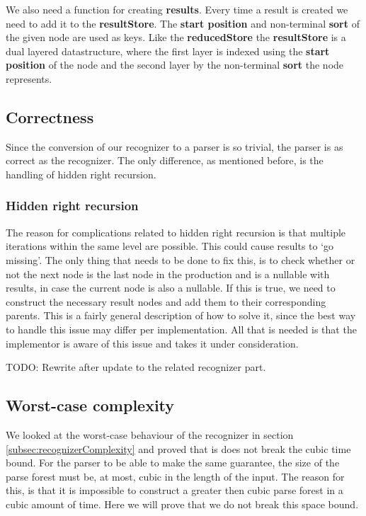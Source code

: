 \documentclass[a4paper,10pt]{article}
\begin{document}
We also need a function for creating {\bf results}. Every time a result is created we need to add it to the {\bf resultStore}. The {\bf start position} and non-terminal {\bf sort} of the given node are used as keys. Like the {\bf reducedStore} the {\bf resultStore} is a dual layered datastructure, where the first layer is indexed using the {\bf start position} of the node and the second layer by the non-terminal {\bf sort} the node represents.

\subsection{Correctness}
\label{sec:parserCorrectness}

Since the conversion of our recognizer to a parser is so trivial, the parser is as correct as the recognizer. The only difference, as mentioned before, is the handling of hidden right recursion.

\subsubsection{Hidden right recursion}
The reason for complications related to hidden right recursion is that multiple iterations within the same level are possible. This could cause results to `go missing'. The only thing that needs to be done to fix this, is to check whether or not the next node is the last node in the production and is a nullable with results, in case the current node is also a nullable. If this is true, we need to construct the necessary result nodes and add them to their corresponding parents. This is a fairly general description of how to solve it, since the best way to handle this issue may differ per implementation. All that is needed is that the implementor is aware of this issue and takes it under consideration.

TODO: Rewrite after update to the related recognizer part.

\subsection{Worst-case complexity}
We looked at the worst-case behaviour of the recognizer in section \ref{subsec:recognizerComplexity} and proved that is does not break the cubic time bound. For the parser to be able to make the same guarantee, the size of the parse forest must be, at most, cubic in the length of the input. The reason for this, is that it is impossible to construct a greater then cubic parse forest in a cubic amount of time. Here we will prove that we do not break this space bound.
\end{document}
